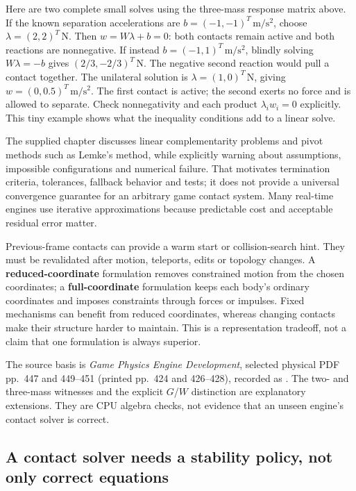 Here are two complete small solves using the three-mass response matrix above. If the known separation accelerations are \(b=(-1,-1)^T\,\mathrm{m/s^2}\), choose \(\lambda=(2,2)^T\,\mathrm N\). Then \(w=W\lambda+b=0\): both contacts remain active and both reactions are nonnegative. If instead \(b=(-1,1)^T\,\mathrm{m/s^2}\), blindly solving \(W\lambda=-b\) gives \((2/3,-2/3)^T\,\mathrm N\). The negative second reaction would pull a contact together. The unilateral solution is \(\lambda=(1,0)^T\,\mathrm N\), giving \(w=(0,0.5)^T\,\mathrm{m/s^2}\). The first contact is active; the second exerts no force and is allowed to separate. Check nonnegativity and each product \(\lambda_iw_i=0\) explicitly. This tiny example shows what the inequality conditions add to a linear solve.

The supplied chapter discusses linear complementarity problems and pivot methods such as Lemke's method, while explicitly warning about assumptions, impossible configurations and numerical failure. That motivates termination criteria, tolerances, fallback behavior and tests; it does not provide a universal convergence guarantee for an arbitrary game contact system. Many real-time engines use iterative approximations because predictable cost and acceptable residual error matter.

Previous-frame contacts can provide a warm start or collision-search hint. They must be revalidated after motion, teleports, edits or topology changes. A \textbf{reduced-coordinate} formulation removes constrained motion from the chosen coordinates; a \textbf{full-coordinate} formulation keeps each body's ordinary coordinates and imposes constraints through forces or impulses. Fixed mechanisms can benefit from reduced coordinates, whereas changing contacts make their structure harder to maintain. This is a representation tradeoff, not a claim that one formulation is always superior.

The source basis is \emph{Game Physics Engine Development}, selected physical PDF pp.~447 and 449--451 (printed pp.~424 and 426--428), recorded as . The two- and three-mass witnesses and the explicit \(G\)/\(W\) distinction are explanatory extensions. They are CPU algebra checks, not evidence that an unseen engine's contact solver is correct.

\subsection{A contact solver needs a stability policy, not only correct equations}\label{06-engine-ii-ch046-a-contact-solver-needs-a-stability-policy-not-only-correct-equations}

